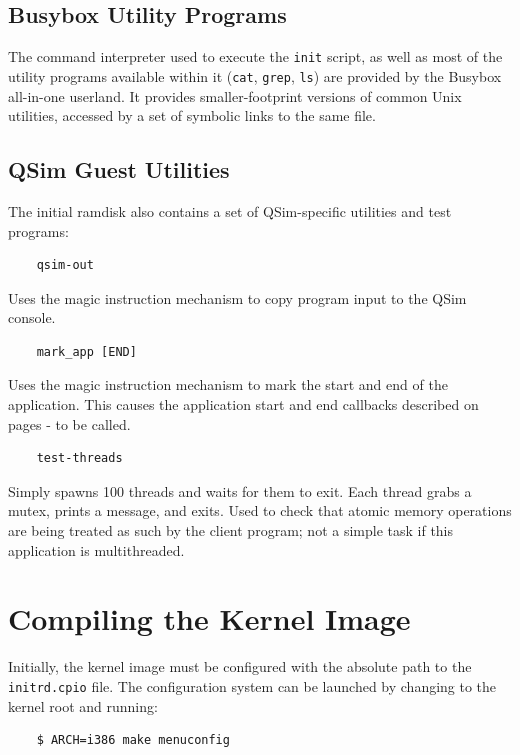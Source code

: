 \documentclass[letterpaper, 10pt]{book}
\begin{document}
\subsection{Busybox Utility Programs}
The command interpreter used to execute the \texttt{init} script, as well as
most of the utility programs available within it (\texttt{cat}, \texttt{grep},
\texttt{ls}) are provided by the Busybox all-in-one userland.
It provides smaller-footprint versions of common Unix utilities, accessed by a
set of symbolic links to the same file.

\subsection{QSim Guest Utilities}
The initial ramdisk also contains a set of QSim-specific utilities and test
programs:

\begin{verbatim}
    qsim-out
\end{verbatim}
Uses the magic instruction mechanism to copy program input to the QSim console.

\begin{verbatim}
    mark_app [END]
\end{verbatim}
Uses the magic instruction mechanism to mark the start and end of the
application. This causes the application start and end callbacks described on
pages \pageref{func:set_app_start_cb}-\pageref{tf:set_app_end_cb} to be called.


\begin{verbatim}
    test-threads
\end{verbatim}
Simply spawns 100 threads and waits for them to exit. Each thread grabs a
mutex, prints a message, and exits. Used to check that atomic memory operations
are being treated as such by the client program; not a simple task if this
application is multithreaded.

\section{Compiling the Kernel Image}

Initially, the kernel image must be configured with the absolute path to the
\texttt{initrd.cpio} file. The configuration system can be launched by changing
to the kernel root and running:

\begin{verbatim}
    $ ARCH=i386 make menuconfig
\end{verbatim}
\end{document}

